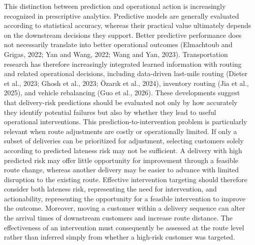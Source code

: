 \documentclass[
]{article}
\begin{document}
This distinction between prediction and operational action is
increasingly recognized in prescriptive analytics. Predictive models are
generally evaluated according to statistical accuracy, whereas their
practical value ultimately depends on the downstream decisions they
support. Better predictive performance does not necessarily translate
into better operational outcomes (Elmachtoub and Grigas, 2022; Yan and
Wang, 2022; Wang and Yan, 2023). Transportation research has therefore
increasingly integrated learned information with routing and related
operational decisions, including data-driven last-mile routing (Dieter
et al., 2023; Ghosh et al., 2023; Özarık et al., 2024), inventory
routing (Jia et al., 2025), and vehicle rebalancing (Guo et al., 2026).
These developments suggest that delivery-risk predictions should be
evaluated not only by how accurately they identify potential failures
but also by whether they lead to useful operational interventions. This
prediction-to-intervention problem is particularly relevant when route
adjustments are costly or operationally limited. If only a subset of
deliveries can be prioritized for adjustment, selecting customers solely
according to predicted lateness risk may not be sufficient. A delivery
with high predicted risk may offer little opportunity for improvement
through a feasible route change, whereas another delivery may be easier
to advance with limited disruption to the existing route. Effective
intervention targeting should therefore consider both lateness risk,
representing the need for intervention, and actionability, representing
the opportunity for a feasible intervention to improve the outcome.
Moreover, moving a customer within a delivery sequence can alter the
arrival times of downstream customers and increase route distance. The
effectiveness of an intervention must consequently be assessed at the
route level rather than inferred simply from whether a high-risk
customer was targeted.
\end{document}
